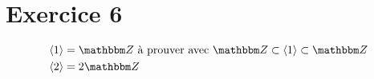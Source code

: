 \part{Exercice 6}

\begin{align*}
	&\left<1 \right> = \Z
	\text{ à prouver avec } \Z \subset \left< 1 \right> \subset \Z
	\\
	&\left< 2 \right> = 2\Z
\end{align*}
